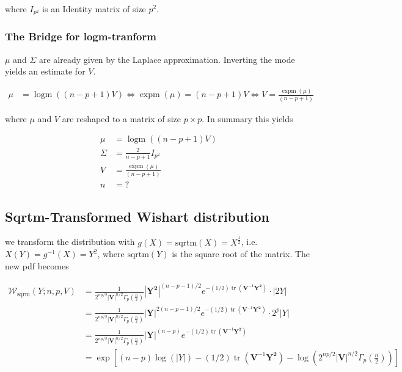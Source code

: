 where $I_{p^2}$ is an Identity matrix of size $p^2$. 

\subsubsection{The Bridge for logm-tranform}

$\mu$ and $\Sigma$ are already given by the Laplace approximation. Inverting the mode yields an estimate for $V$. 

\begin{align}
	\mu &= \operatorname{logm}((n-p+1)V) \Leftrightarrow \operatorname{expm}(\mu) = (n-p+1)V \Leftrightarrow V = \frac{\operatorname{expm}(\mu)}{(n-p+1)}
\end{align}

where $\mu$ and $V$ are reshaped to a matrix of size $p\times p$. In summary this yields

\begin{subequations}
\begin{align}
	\mu &= \operatorname{logm}((n-p+1)V) \\
	\Sigma &= \frac{2}{n-p+1} I_{p^2} \\
	V &= \frac{\operatorname{expm}(\mu)}{(n-p+1)} \\
	n &= ?
\end{align} 
\end{subequations}

\subsection{Sqrtm-Transformed Wishart distribution}

we transform the distribution with $g(X) = \text{sqrtm}(X) = X^{\frac{1}{2}}$, i.e. $X(Y) = g^{-1}(X) = Y^2$, where $\text{sqrtm}(Y)$ is the square root of the matrix. The new pdf becomes

\begin{subequations}
\begin{align}
\mathcal{W}_{\text{sqrm}}(Y; n,p,V) &= \frac{1}{2^{np/2} \left|{\mathbf V}\right|^{n/2} \Gamma_p\left(\frac {n}{2}\right ) }{\left|\mathbf{Y^2}\right|}^{(n-p-1)/2} e^{-(1/2)\operatorname{tr}({\mathbf V}^{-1}\mathbf{Y^2})} \cdot |2Y| \\ 
&= \frac{1}{2^{np/2} \left|{\mathbf V}\right|^{n/2} \Gamma_p\left(\frac {n}{2}\right ) }{\left|\mathbf{Y}\right|}^{2(n-p-1)/2} e^{-(1/2)\operatorname{tr}({\mathbf V}^{-1}\mathbf{Y^2})} \cdot 2^p|Y| \\
&= \frac{1}{2^{np/2} \left|{\mathbf V}\right|^{n/2} \Gamma_p\left(\frac {n}{2}\right ) }{\left|\mathbf{Y}\right|}^{(n-p)} e^{-(1/2)\operatorname{tr}({\mathbf V}^{-1}\mathbf{Y^2})} \\
&= \exp \left[(n-p) \log(|Y|) - (1/2)\operatorname{tr}({\mathbf V}^{-1}\mathbf{Y^2}) - \log\left(2^{np/2} \left|{\mathbf V}\right|^{n/2} \Gamma_p\left(\frac {n}{2}\right )\right)\right]
\end{align}
\end{subequations}

